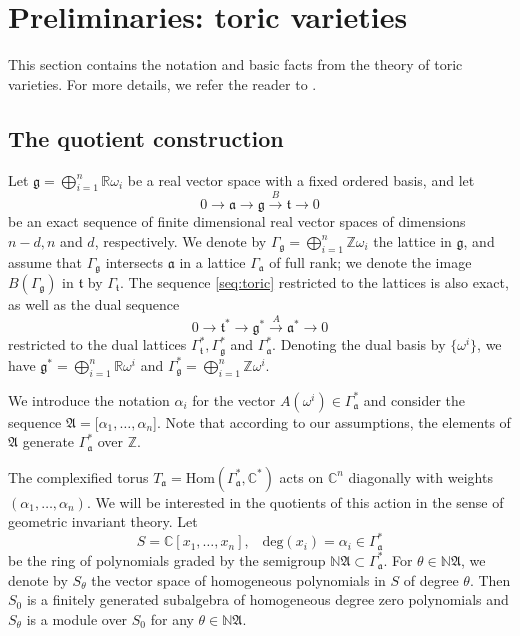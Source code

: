 \documentclass[11pt]{article}
\theoremstyle{definition}
\numberwithin{equation}{section}
\newcommand{\A}{\mathfrak{A}}
\begin{document}
\section{Preliminaries: toric varieties}\label{sec:toric}

This section contains the notation and basic facts from the theory of toric 
varieties. For more details, we refer the reader to \cite{Fulton, SzV}. 


\subsection{The quotient construction}\label{S2.1}

 Let $\mathfrak{g}=\bigoplus_{i=1}^n\mathbb{R}\omega_i$ be a real vector space with a fixed ordered basis, and let 
\begin{equation}\label{seq:toric}
0\to\mathfrak{a}\to \mathfrak{g}\xrightarrow{B} \mathfrak{t}\to 0
\end{equation}
be an exact sequence of finite dimensional real vector spaces of dimensions 
$n-d, n$ and $d$, respectively. We denote by $\Gamma_{\mathfrak{g}} = 
\bigoplus_{i=1}^n\mathbb{Z}\omega_i$ the lattice in $\mathfrak{g}$, and assume 
that $\Gamma_{\mathfrak{g}}$ intersects $\mathfrak{a}$ in a lattice 
$\Gamma_{\mathfrak{a}}$ of full rank; we denote the image 
$B(\Gamma_{\mathfrak{g}})$ in $\mathfrak{t}$ by $\Gamma_{\mathfrak{t}}$. The 
sequence \eqref{seq:toric} restricted to the lattices is also exact, as well as 
the dual sequence
\begin{equation*}\label{seq:toricdual}
0\to\mathfrak{t}^*\to \mathfrak{g}^*\xrightarrow{A} \mathfrak{a}^*\to 0
\end{equation*}
restricted to the dual lattices $\Gamma_{\mathfrak{t}}^*, \Gamma_{\mathfrak{g}}^* $ and $\Gamma_{\mathfrak{a}}^*$. 
Denoting the dual basis by $\{\omega^i\}$, we have $\mathfrak{g}^*=\bigoplus_{i=1}^n\mathbb{R}\omega^i$ and $\Gamma_{\mathfrak{g}}^* = \bigoplus_{i=1}^n\mathbb{Z}\omega^i$. 

We introduce the notation $\alpha_i$ for the vector $A(\omega^i)\in 
\Gamma_{\mathfrak{a}}^*$ and consider the  sequence $\mathfrak{A} = [\alpha_1,  \ldots , \alpha_n$]. Note that according to our assumptions, the elements of 
$\mathfrak{A}$ generate $\Gamma_{\mathfrak{a}}^*$ over $\mathbb{Z}$. 



The complexified torus $T_{\mathfrak{a}}=\mathrm{Hom}(\Gamma_\mathfrak{a}^*,\mathbb{C}^*)$ acts on $\mathbb{C}^n$ diagonally with weights $(\alpha_1, \ldots, \alpha_n)$. We will be interested in the quotients of this action in the sense of  geometric invariant theory. Let 
$$S = \mathbb{C}[x_1, \ldots, x_n], \,\,\,\,\,  \mathrm{deg}(x_i) = 
\alpha_i\in\Gamma_{\mathfrak{a}}^*$$ be the ring of polynomials graded by the 
semigroup $\mathbb{N}\A\subset\Gamma_{\mathfrak{a}}^*$. For $\theta \in 
\mathbb{N}\A$, we denote by $S_\theta$ the vector space of homogeneous 
polynomials in $ S $ of degree $\theta$. Then $S_0$ is a finitely generated 
subalgebra of homogeneous degree zero polynomials  and  $S_\theta$ is a module 
over $S_0$ for any $\theta\in\mathbb{N}\A$. 
\end{document}

